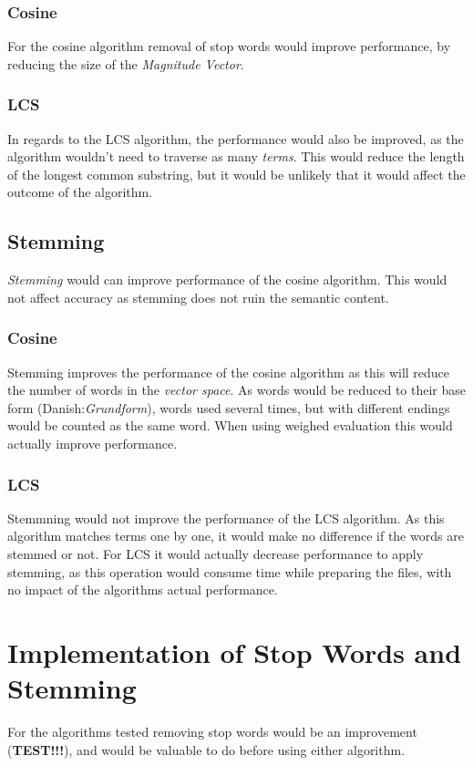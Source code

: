 \subsubsection{Cosine}
For the cosine algorithm removal of stop words would improve performance, by reducing the size of the \textit{Magnitude Vector}. 

\subsubsection{LCS}
In regards to the LCS algorithm, the performance would also be improved, as the algorithm wouldn't need to traverse as many \textit{terms}. This would reduce the length of the longest common substring, but it would be unlikely that it would affect the outcome of the algorithm.

\subsection{Stemming}
\textit{Stemming} would can improve performance of the cosine algorithm. This would not affect accuracy as stemming does not ruin the semantic content.

\subsubsection{Cosine}
Stemming improves the performance of the cosine algorithm as this will reduce the number of words in the \textit{vector space}. As words would be reduced to their base form (Danish:\textit{Grundform}), words used several times, but with different endings would be counted as the same word. When using weighed evaluation this would actually improve performance.

\subsubsection{LCS}
Stemmning would not improve the performance of the LCS algorithm. As this algorithm matches terms one by one, it would make no difference if the words are stemmed or not. For LCS it would actually decrease performance to apply stemming, as this operation would consume time while preparing the files, with no impact of the algorithms actual performance.

\section{Implementation of Stop Words and Stemming}
For the algorithms tested removing stop words would be an improvement (\textbf{TEST!!!}), and would be valuable to do before using either algorithm.

